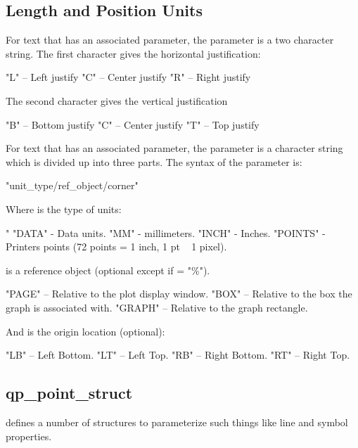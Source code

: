 \subsection{Length and Position Units}
\label{s:qp.units}

For text that has an associated  parameter, the  parameter is a two
character string.  The first character gives the horizontal justification:
\begin{example}
   "L" -- Left justify
   "C" -- Center justify
   "R" -- Right justify
\end{example}
The second character gives the vertical justification
\begin{example}
   "B" -- Bottom justify
   "C" -- Center justify
   "T" -- Top justify
\end{example}

For text that has an associated  parameter, the  parameter is a character string
which is divided up into three parts. The syntax of the  parameter is:
\begin{example}
   "unit_type/ref_object/corner"
\end{example}
Where  is the type of units:
\begin{example}
   "%
   "DATA"    - Data units.
   "MM"      - millimeters.
   "INCH"    - Inches.
   "POINTS"  - Printers points (72 points = 1 inch, 1 pt ~ 1 pixel).
\end{example}
 is a reference object (optional except if  = "\%").
\begin{example}
   "PAGE"  -- Relative to the plot display window.
   "BOX"   -- Relative to the box the graph is associated with.
   "GRAPH" -- Relative to the graph rectangle.
\end{example}
And  is the origin location (optional):
\begin{example}
   "LB" -- Left Bottom.
   "LT" -- Left Top.
   "RB" -- Right Bottom.
   "RT" -- Right Top.
\end{example}

\subsection{qp\_point\_struct}
\label{s:qp.point}

 defines a number of structures to parameterize such things like line and symbol
properties.

